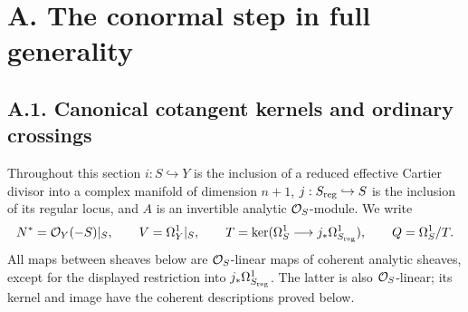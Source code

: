
\section{A. The conormal step in full generality}

\subsection{A.1. Canonical cotangent kernels and ordinary crossings}


Throughout this section $i:S\hookrightarrow Y$ is the inclusion of a reduced effective Cartier divisor into a complex manifold of dimension $n+1$, $j:S_{\rm reg}\hookrightarrow S$ is the inclusion of its regular locus, and $A$ is an invertible analytic $\mathcal O_S$-module. We write
\[
 N^*=\mathcal O_Y(-S)|_S,\qquad V=\Omega_Y^1|_S,\qquad
 T=\ker(\Omega_S^1\longrightarrow j_*\Omega^1_{S_{\rm reg}}),\qquad Q=\Omega_S^1/T.
\]
All maps between sheaves below are $\mathcal O_S$-linear maps of coherent analytic sheaves, except for the displayed restriction into $j_*\Omega^1_{S_{\rm reg}}$. The latter is also $\mathcal O_S$-linear; its kernel and image have the coherent descriptions proved below.


